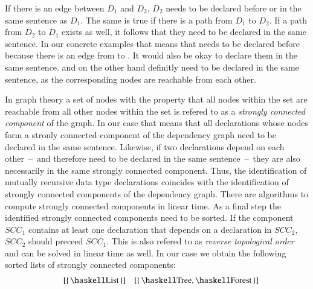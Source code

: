 If there is an edge between $D_1$ and $D_2$, $D_2$ needs to be declared before or in the same sentence as $D_1$.
The same is true if there is a path from $D_1$ to $D_2$.
If a path from $D_2$ to $D_1$ exists as well, it follows that they need to be declared in the same sentence.
In our concrete examples that means that  needs to be declared before  because there is an edge from  to .
It would also be okay to declare them in the same sentence.
 and  on the other hand definitly need to be declared in the same sentence, as the corresponding nodes are reachable from each other.

In graph theory a set of nodes with the property that all nodes within the set are reachable from all other nodes within the set is refered to as a \textit{strongly connected component} of the graph.
In our case that means that all declarations whose nodes form a stronly connected component of the dependency graph need to be declared in the same sentence.
Likewise, if two declarations depend on each other~--~and therefore need to be declared in the same sentence~--~they are also necessarily in the same strongly connected component.
Thus, the identification of mutually recursive data type declarations coincides with the identification of strongly connected components of the dependency graph.
There are algorithms to compute strongly connected components in linear time.
As a final step the identified strongly connected components need to be sorted.
If the component $SCC_1$ contains at least one declaration that depends on a declaration in $SCC_2$, $SCC_2$ should preceed $SCC_1$.
This is also refered to as \textit{reverse topological order} and can be solved in linear time as well.
In our case we obtain the following sorted lists of strongly connected components:
\begin{align*}
  [\{\, \haskellM{B} \,\}, \{\, \haskellM{A} \,\}]
  && [\{\, \haskellM{List} \,\}]
  && [\{\, \haskellM{Tree}, \haskellM{Forest} \,\}]
\end{align*}

